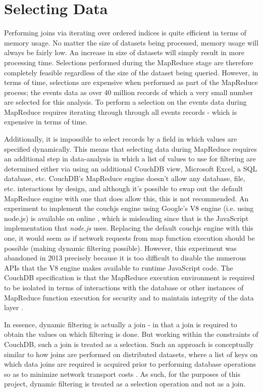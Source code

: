 

\section{Selecting Data}
Performing joins via iterating over ordered indices is quite efficient in terms of memory usage. No matter the size of datasets being processed, memory usage will always be fairly low. An increase in size of datasets will simply result in more processing time. Selections performed during the MapReduce stage are therefore completely feasible regardless of the size of the dataset being queried. However, in terms of time, selections are expensive when performed as part of the MapReduce process; the events data as over 40 million records of which a very small number are selected for this analysis. To perform a selection on the events data during MapReduce requires iterating through through all events records - which is expensive in terms of time.

Additionally, it is impossible to select records by a field in which values are specified dynamically. This means that selecting data during MapReduce requires an additional step in data-analysis in which a list of values to use for filtering are determined either via using an additional CouchDB view, Microsoft Excel, a SQL database, etc. CouchDB's MapReduce engine doesn't allow any database, file, etc. interactions by design, and although it's possible to swap out the default MapReduce engine with one that does allow this, this is not recommended. An experiment to implement the couchjs engine using Google's V8 engine (i.e. using node.js) is available on online \cite{v8couchjs}, which is misleading since that is the JavaScript implementation that \textit{node.js} uses. Replacing the default couchjs engine with this one, it would seem as if network requests from map function execution should be possible (making dynamic filtering possible). However, this experiment was abandoned in 2013 precisely because it is too difficult to disable the numerous APIs that the V8 engine makes available to runtime JavaScript code. The CouchDB specification is that the MapReduce execution environment is required to be isolated in terms of interactions with the database or other instances of MapReduce function execution for security and to maintain integrity of the data layer \cite{slack28Feb}.

In essence, dynamic filtering is actually a join - in that a join is required to obtain the values on which filtering is done. But working within the constraints of CouchDB, such a join is treated as a selection. Such an approach is conceptually similar to how joins are performed on distributed datasets, where a list of keys on which data joins are required is acquired prior to performing database operations so as to minimize network transport costs \cite{sonia2018}. As such, for the purposes of this project, dynamic filtering is treated as a selection operation and not as a join.

